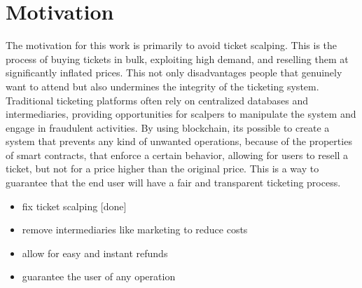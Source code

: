 \section{Motivation}

The motivation for this work is primarily to avoid ticket scalping. This is the process of buying tickets in bulk, exploiting high demand, and reselling them at significantly inflated prices. This not only disadvantages people that genuinely want to attend but also undermines the integrity of the ticketing system. Traditional ticketing platforms often rely on centralized databases and intermediaries, providing opportunities for scalpers to manipulate the system and engage in fraudulent activities. By using blockchain, its possible to create a system that prevents any kind of unwanted operations, because of the properties of smart contracts, that enforce a certain behavior, allowing for users to resell a ticket, but not for a price higher than the original price. This is a way to guarantee that the end user will have a fair and transparent ticketing process.

    {\color{red}
        \begin{itemize}
            \item fix ticket scalping [done]
            \item remove intermediaries like marketing to reduce costs
            \item allow for easy and instant refunds
            \item guarantee the user of any operation
        \end{itemize}
    }